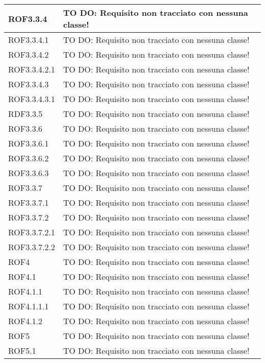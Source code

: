 \begin{center}
\begin{longtable}{| p{2.5cm} | p{11cm} |}
\hline
ROF3.3.4 & TO DO: Requisito non tracciato con nessuna classe! \\
\hline
ROF3.3.4.1 & TO DO: Requisito non tracciato con nessuna classe! \\
\hline
ROF3.3.4.2 & TO DO: Requisito non tracciato con nessuna classe! \\
\hline
ROF3.3.4.2.1 & TO DO: Requisito non tracciato con nessuna classe! \\
\hline
ROF3.3.4.3 & TO DO: Requisito non tracciato con nessuna classe! \\
\hline
ROF3.3.4.3.1 & TO DO: Requisito non tracciato con nessuna classe! \\
\hline
RDF3.3.5 & TO DO: Requisito non tracciato con nessuna classe! \\
\hline
ROF3.3.6 & TO DO: Requisito non tracciato con nessuna classe! \\
\hline
ROF3.3.6.1 & TO DO: Requisito non tracciato con nessuna classe! \\
\hline
ROF3.3.6.2 & TO DO: Requisito non tracciato con nessuna classe! \\
\hline
ROF3.3.6.3 & TO DO: Requisito non tracciato con nessuna classe! \\
\hline
ROF3.3.7 & TO DO: Requisito non tracciato con nessuna classe! \\
\hline
ROF3.3.7.1 & TO DO: Requisito non tracciato con nessuna classe! \\
\hline
ROF3.3.7.2 & TO DO: Requisito non tracciato con nessuna classe! \\
\hline
ROF3.3.7.2.1 & TO DO: Requisito non tracciato con nessuna classe! \\
\hline
ROF3.3.7.2.2 & TO DO: Requisito non tracciato con nessuna classe! \\
\hline
ROF4 & TO DO: Requisito non tracciato con nessuna classe! \\
\hline
ROF4.1 & TO DO: Requisito non tracciato con nessuna classe! \\
\hline
ROF4.1.1 & TO DO: Requisito non tracciato con nessuna classe! \\
\hline
ROF4.1.1.1 & TO DO: Requisito non tracciato con nessuna classe! \\
\hline
ROF4.1.2 & TO DO: Requisito non tracciato con nessuna classe! \\
\hline
ROF5 & TO DO: Requisito non tracciato con nessuna classe! \\
\hline
ROF5.1 & TO DO: Requisito non tracciato con nessuna classe! \\
\hline

\end{longtable}
\end{center}

